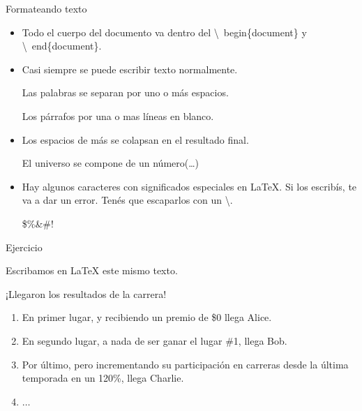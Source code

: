 \begin{frame}[fragile]{Formateando texto}
    \small
    \begin{itemize}
    \item Todo el cuerpo del documento va dentro del \textbackslash\ begin\{document\} y \textbackslash\ end\{document\}.
    \item Casi siempre se puede escribir texto normalmente.
    \begin{exampletwouptiny}
    Las palabras se separan 
    por uno o más espacios.

    Los párrafos por una o 
    mas líneas en blanco.
    \end{exampletwouptiny}
    \item Los espacios de más se colapsan en el resultado final.
    \begin{exampletwouptiny}

    El     universo    se compone 
    de un           número(\dots)
        
    \end{exampletwouptiny}
    \item Hay algunos caracteres con significados especiales en \LaTeX{}. Si los escribís, te va a dar un error. Tenés que escaparlos con un \textbackslash.
    \begin{exampletwoup}
        \$\%\&\#!
        \end{exampletwoup}
    \end{itemize}
\end{frame}


\begin{frame}[fragile]{Ejercicio}

    Escribamos en \LaTeX{}  este mismo texto.

    \begin{tcolorbox}[colframe=color1]
        \begin{center}
            ¡Llegaron los resultados de la carrera!
            \begin{enumerate}
            \item En primer lugar, y recibiendo un premio de \$0 llega Alice.
            \item En segundo lugar, a nada de ser ganar el lugar \#1, llega Bob.
            \item Por último, pero incrementando su participación en carreras desde la última temporada en un 120\%, llega Charlie.
            \item $\ldots$
            \end{enumerate}
        \end{center}
    \end{tcolorbox}
    
    \begin{center}
    \end{center}
    
\end{frame}

